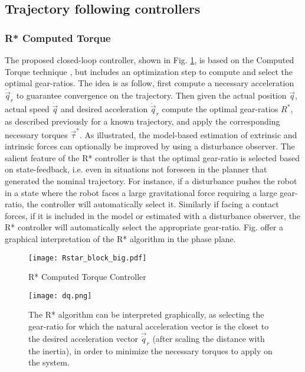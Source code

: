 \newpage



\subsection{Trajectory following controllers}

\subsubsection{R* Computed Torque}
\label{sec:RobustTrajectoryFollowingController}


The proposed closed-loop controller, shown in Fig. \ref{fig:Rstar_block_big}, is based on the Computed Torque technique \cite{asada_robot_1986}, but includes an optimization step to compute and select the optimal gear-ratios. The idea is as follow, first compute a necessary acceleration $\ddot{\vec{q}}_r$ to guarantee convergence on the trajectory. Then given the actual position $\vec{q}$, actual speed $\dot{\vec{q}}$ and desired acceleration $\ddot{\vec{q}}_r$ compute the optimal gear-ratios $R^*$, as described previously for a known trajectory, and apply the corresponding necessary torques $\vec{\tau}^*$. As illustrated, the model-based estimation of extrinsic and intrinsic forces can optionally be improved by using a disturbance observer. The salient feature of the R* controller is that the optimal gear-ratio is selected based on state-feedback, i.e. even in situations not foreseen in the planner that generated the nominal trajectory. For instance, if a disturbance pushes the robot in a state where the robot faces a large gravitational force requiring a large gear-ratio, the controller will automatically select it. Similarly if facing a contact forces, if it is included in the model or estimated with a disturbance observer, the R* controller will automatically select the appropriate gear-ratio. Fig. \pageref{fig:dq} offer a graphical interpretation of the R* algorithm in the phase plane. 

\begin{figure}[t]
	\centering
		\texttt{[image: Rstar\_block\_big.pdf]}
	\caption{R* Computed Torque Controller}
	\label{fig:Rstar_block_big}
\end{figure}

\begin{figure}[htp]
	\centering
		\texttt{[image: dq.png]}
	\caption[R* algorithm graphical interpretation]{The R* algorithm can be interpreted graphically, as selecting the gear-ratio for which the natural acceleration vector is the closet to the desired acceleration vector $\vec{\ddot{q}}_r$ (after scaling the distance with the inertia), in order to minimize the necessary torques to apply on the system.}
	\label{fig:dq}
\end{figure}

